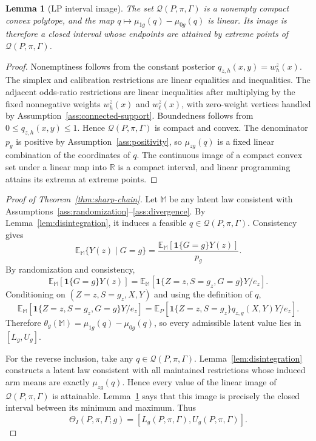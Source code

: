 \documentclass[11pt]{article}
\newcommand{\E}{\mathbb{E}}
\newcommand{\one}{\mathbf{1}}
\theoremstyle{definition}
\theoremstyle{plain}
\newtheorem{lemma}{Lemma}
\theoremstyle{remark}
\begin{document}
\begin{lemma}[LP interval image]\label{lem:lp-interval}
The set \(\mathcal Q(P,\pi,\Gamma)\) is a nonempty compact convex polytope, and
the map \(q\mapsto\mu_{1g}(q)-\mu_{0g}(q)\) is linear.  Its image is therefore a
closed interval whose endpoints are attained by extreme points of
\(\mathcal Q(P,\pi,\Gamma)\).
\end{lemma}

\begin{proof}
Nonemptiness follows from the constant posterior \(q_{z,h}(x,y)=w^z_h(x)\).
The simplex and calibration restrictions are linear equalities and
inequalities.  The adjacent odds-ratio restrictions are linear inequalities
after multiplying by the fixed nonnegative weights \(w^z_h(x)\) and
\(w^z_\ell(x)\), with zero-weight vertices handled by
Assumption~\ref{ass:connected-support}.  Boundedness follows from
\(0\le q_{z,h}(x,y)\le1\).  Hence \(\mathcal Q(P,\pi,\Gamma)\) is compact and
convex.  The denominator \(p_g\) is positive by Assumption~\ref{ass:positivity},
so \(\mu_{zg}(q)\) is a fixed linear combination of the coordinates of \(q\).
The continuous image of a compact convex set under a linear map into
\(\mathbb R\) is a compact interval, and linear programming attains its extrema
at extreme points.
\end{proof}

\begin{proof}[Proof of Theorem~\ref{thm:sharp-chain}]
Let \(\mathbb M\) be any latent law consistent with
Assumptions~\ref{ass:randomization}--\ref{ass:divergence}.  By
Lemma~\ref{lem:disintegration}, it induces a feasible
\(q\in\mathcal Q(P,\pi,\Gamma)\).  Consistency gives
\[
  \E_{\mathbb M}\{Y(z)\mid G=g\}
  =
  \frac{
    \E_{\mathbb M}[\one\{G=g\}Y(z)]
  }{p_g}.
\]
By randomization and consistency,
\[
  \E_{\mathbb M}[\one\{G=g\}Y(z)]
  =
  \E_{\mathbb M}[\one\{Z=z,S=g_z,G=g\}Y/e_z].
\]
Conditioning on \((Z=z,S=g_z,X,Y)\) and using the definition of \(q\),
\[
  \E_{\mathbb M}[\one\{Z=z,S=g_z,G=g\}Y/e_z]
  =
  \E_P[\one\{Z=z,S=g_z\}q_{z,g}(X,Y)Y/e_z].
\]
Therefore \(\theta_g(\mathbb M)=\mu_{1g}(q)-\mu_{0g}(q)\), so every admissible
latent value lies in \([L_g,U_g]\).

For the reverse inclusion, take any \(q\in\mathcal Q(P,\pi,\Gamma)\).
Lemma~\ref{lem:disintegration} constructs a latent law consistent with all
maintained restrictions whose induced arm means are exactly
\(\mu_{zg}(q)\).  Hence every value of the linear image of
\(\mathcal Q(P,\pi,\Gamma)\) is attainable.  Lemma~\ref{lem:lp-interval} says
that this image is precisely the closed interval between its minimum and
maximum.  Thus
\[
  \Theta_I(P,\pi,\Gamma;g)
  =
  [L_g(P,\pi,\Gamma),U_g(P,\pi,\Gamma)].
\]
\end{proof}
\end{document}
